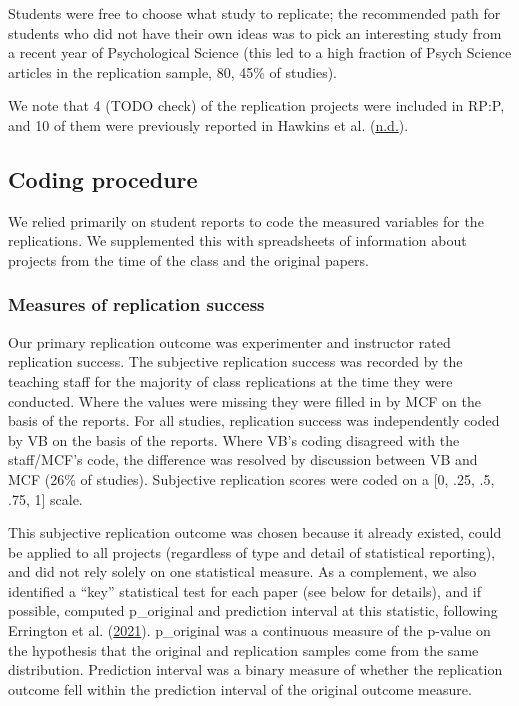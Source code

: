 \documentclass[
  english,
  a4paper,
]{article}
\begin{document}
Students were free to choose what study to replicate; the recommended path for students who did not have their own ideas was to pick an interesting study from a recent year of Psychological Science (this led to a high fraction of Psych Science articles in the replication sample, 80, 45\% of studies).

We note that 4 (TODO check) of the replication projects were included in RP:P, and 10 of them were previously reported in Hawkins et al. (\protect\hyperlink{ref-hawkins}{n.d.}).

\hypertarget{coding-procedure}{%
\subsection{Coding procedure}\label{coding-procedure}}

We relied primarily on student reports to code the measured variables for the replications. We supplemented this with spreadsheets of information about projects from the time of the class and the original papers.

\hypertarget{measures-of-replication-success}{%
\subsubsection{Measures of replication success}\label{measures-of-replication-success}}

Our primary replication outcome was experimenter and instructor rated replication success. The subjective replication success was recorded by the teaching staff for the majority of class replications at the time they were conducted. Where the values were missing they were filled in by MCF on the basis of the reports. For all studies, replication success was independently coded by VB on the basis of the reports. Where VB's coding disagreed with the staff/MCF's code, the difference was resolved by discussion between VB and MCF (26\% of studies). Subjective replication scores were coded on a {[}0, .25, .5, .75, 1{]} scale.

This subjective replication outcome was chosen because it already existed, could be applied to all projects (regardless of type and detail of statistical reporting), and did not rely solely on one statistical measure. As a complement, we also identified a ``key'' statistical test for each paper (see below for details), and if possible, computed p\_original and prediction interval at this statistic, following Errington et al. (\protect\hyperlink{ref-errington2021}{2021}). p\_original was a continuous measure of the p-value on the hypothesis that the original and replication samples come from the same distribution. Prediction interval was a binary measure of whether the replication outcome fell within the prediction interval of the original outcome measure.
\end{document}
